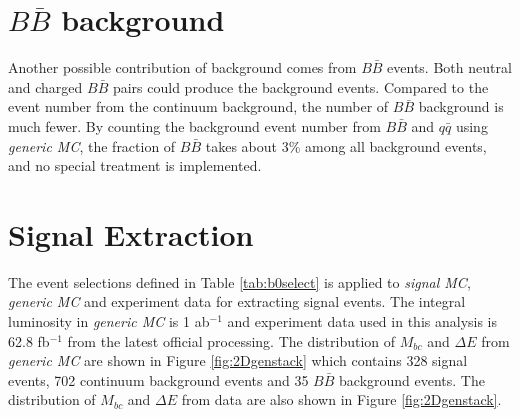 \section{$B\bar{B}$ background}
Another possible contribution of background comes from $B\bar{B}$ events. Both neutral and charged $B\bar{B}$ pairs could produce the background events. Compared to the event number from the continuum background, the number of $B\bar{B}$ background is much fewer. By counting the background event number from $B\bar{B}$ and $q\bar{q}$ using \textit{generic MC}, the fraction of $B\bar{B}$ takes about 3\% among all background events, and no special treatment is implemented. 

\section{Signal Extraction}
The event selections defined in Table \ref{tab:b0select} is applied to \textit{signal MC}, \textit{generic MC} and experiment data for extracting signal events. The integral luminosity in \textit{generic MC} is 1 ab$^{-1}$ and experiment data used in this analysis is 62.8 fb$^{-1}$ from the latest official processing. The distribution of $M_{bc}$ and $\Delta E$ from \textit{generic MC} are shown in Figure \ref{fig:2Dgenstack} which contains 328 signal events,  702 continuum background events and 35 $B\bar{B}$ background events. The distribution of $M_{bc}$ and $\Delta E$ from data are also shown in Figure \ref{fig:2Dgenstack}.

